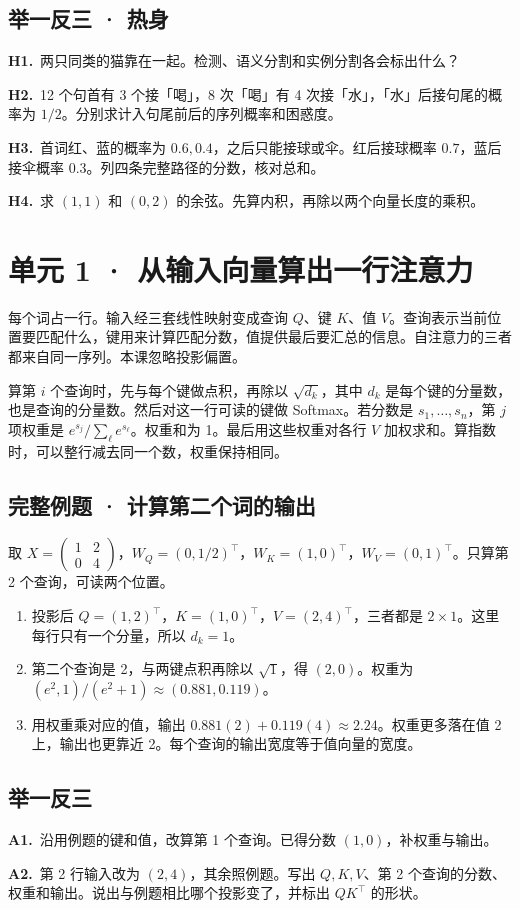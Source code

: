 \documentclass[UTF8,a4paper,11pt]{ctexart}
\newcommand{\CompactQuestion}[2]{\par\noindent\textbf{#1.}\ #2\par\vspace{.8em}}
\begin{document}
\subsection{举一反三 · 热身}
\CompactQuestion{H1}{两只同类的猫靠在一起。检测、语义分割和实例分割各会标出什么？}
\CompactQuestion{H2}{12 个句首有 3 个接「喝」，8 次「喝」有 4 次接「水」，「水」后接句尾的概率为 $1/2$。分别求计入句尾前后的序列概率和困惑度。}
\CompactQuestion{H3}{首词红、蓝的概率为 $0.6,0.4$，之后只能接球或伞。红后接球概率 $0.7$，蓝后接伞概率 $0.3$。列四条完整路径的分数，核对总和。}
\CompactQuestion{H4}{求 $(1,1)$ 和 $(0,2)$ 的余弦。先算内积，再除以两个向量长度的乘积。}
\clearpage
\section{单元 1 · 从输入向量算出一行注意力}
每个词占一行。输入经三套线性映射变成查询 $Q$、键 $K$、值 $V$。查询表示当前位置要匹配什么，键用来计算匹配分数，值提供最后要汇总的信息。自注意力的三者都来自同一序列。本课忽略投影偏置。

算第 $i$ 个查询时，先与每个键做点积，再除以 $\sqrt{d_k}$，其中 $d_k$ 是每个键的分量数，也是查询的分量数。然后对这一行可读的键做 Softmax。若分数是 $s_1,\ldots,s_n$，第 $j$ 项权重是 $e^{s_j}/\sum_\ell e^{s_\ell}$。权重和为 1。最后用这些权重对各行 $V$ 加权求和。算指数时，可以整行减去同一个数，权重保持相同。

\subsection{完整例题 · 计算第二个词的输出}
取 $X=\begin{pmatrix}1&2\\0&4\end{pmatrix}$，$W_Q=(0,1/2)^\top$，$W_K=(1,0)^\top$，$W_V=(0,1)^\top$。只算第 2 个查询，可读两个位置。

\begin{enumerate}
\item 投影后 $Q=(1,2)^\top$，$K=(1,0)^\top$，$V=(2,4)^\top$，三者都是 $2\times1$。这里每行只有一个分量，所以 $d_k=1$。
\item 第二个查询是 2，与两键点积再除以 $\sqrt1$，得 $(2,0)$。权重为 $(e^2,1)/(e^2+1)\approx(0.881,0.119)$。
\item 用权重乘对应的值，输出 $0.881(2)+0.119(4)\approx2.24$。权重更多落在值 2 上，输出也更靠近 2。每个查询的输出宽度等于值向量的宽度。
\end{enumerate}
\subsection{举一反三}
\CompactQuestion{A1}{沿用例题的键和值，改算第 1 个查询。已得分数 $(1,0)$，补权重与输出。}
\CompactQuestion{A2}{第 2 行输入改为 $(2,4)$，其余照例题。写出 $Q,K,V$、第 2 个查询的分数、权重和输出。说出与例题相比哪个投影变了，并标出 $QK^\top$ 的形状。}
\clearpage
\end{document}
